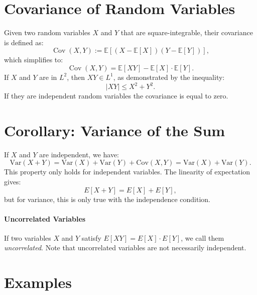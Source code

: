     \section{Covariance of Random Variables}
    Given two random variables \(X\) and \(Y\) that are square-integrable, their covariance is defined as:
    \[
    \operatorname{Cov}(X, Y) := \mathbb{E}[(X - \mathbb{E}[X])(Y - \mathbb{E}[Y])],
    \]
    which simplifies to:
    \[
    \operatorname{Cov}(X, Y) = \mathbb{E}[XY] - \mathbb{E}[X] \cdot \mathbb{E}[Y].
    \]
    If \(X\) and \(Y\) are in \(L^2\), then \(XY \in L^1\), as demonstrated by the inequality:
    \[
    |XY| \leq X^2 + Y^2.
    \]
    If they are independent random variables the covariance is equal to zero.
    

\section{Corollary: Variance of the Sum}
If \( X \) and \( Y \) are independent, we have:
\[
\text{Var}(X + Y) = \text{Var}(X) + \text{Var}(Y) + \text{Cov}(X,Y) = \text{Var}(X) + \text{Var}(Y).
\]
This property only holds for independent variables. The linearity of expectation gives:
\[
E[X + Y] = E[X] + E[Y],
\]
but for variance, this is only true with the independence condition.

\paragraph{Uncorrelated Variables}
If two variables \( X \) and \( Y \) satisfy \( E[XY] = E[X] \cdot E[Y] \), we call them \textit{uncorrelated}. Note that uncorrelated variables are not necessarily independent.

    \section{Examples}
